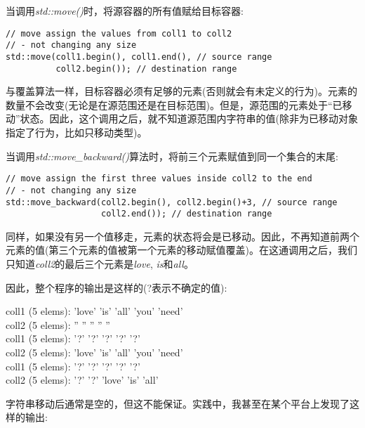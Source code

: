 当调用\textit{std::move()}时，将源容器的所有值赋给目标容器:\par

\begin{lstlisting}[caption={}]
// move assign the values from coll1 to coll2
// - not changing any size
std::move(coll1.begin(), coll1.end(), // source range
		  coll2.begin()); // destination range
\end{lstlisting}

与覆盖算法一样，目标容器必须有足够的元素(否则就会有未定义的行为)。元素的数量不会改变(无论是在源范围还是在目标范围)。但是，源范围的元素处于“已移动”状态。因此，这个调用之后，就不知道源范围内字符串的值(除非为已移动对象指定了行为，比如只移动类型)。\par

当调用\textit{std::move\_backward()}算法时，将前三个元素赋值到同一个集合的末尾:\par

\begin{lstlisting}[caption={}]
// move assign the first three values inside coll2 to the end
// - not changing any size
std::move_backward(coll2.begin(), coll2.begin()+3, // source range
				   coll2.end()); // destination range
\end{lstlisting}

同样，如果没有另一个值移走，元素的状态将会是已移动。因此，不再知道前两个元素的值(第三个元素的值被第一个元素的移动赋值覆盖)。在这通调用之后，我们只知道\textit{coll2}的最后三个元素是\textit{love}, \textit{is}和\textit{all}。\par

因此，整个程序的输出是这样的(?表示不确定的值):\par

\begin{tcolorbox}[colback=white,colframe=black]
	coll1 (5 elems): 'love' 'is' 'all' 'you' 'need' \\
	coll2 (5 elems): '' '' '' '' '' \\
	coll1 (5 elems): '?' '?' '?' '?' '?' \\
	coll2 (5 elems): 'love' 'is' 'all' 'you' 'need' \\
	coll1 (5 elems): '?' '?' '?' '?' '?' \\
	coll2 (5 elems): '?' '?' 'love' 'is' 'all'
\end{tcolorbox}

字符串移动后通常是空的，但这不能保证。实践中，我甚至在某个平台上发现了这样的输出:\par

